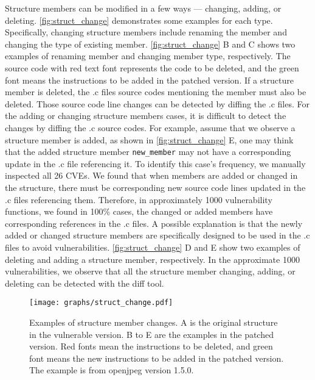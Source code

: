 Structure members can be modified in a few ways --- changing, adding, or deleting. 
\autoref{fig:struct_change} demonstrates some examples for each type.
Specifically, changing structure members include renaming the member and changing the type of existing member. \autoref{fig:struct_change} B and C shows two examples of renaming member and changing member type, respectively.
The source code with red text font represents the code to be deleted, and the green font means the instructions to be added in the patched version. 
If a structure member is deleted, the .c files source codes mentioning the member must also be deleted. 
Those source code line changes can be detected by diffing the .c files. 
For the adding or changing structure members cases, it is difficult to detect the changes by diffing the .c source codes. 
For example, assume that we observe a structure member is added, as shown in \autoref{fig:struct_change} E, one may think that the added structure member \texttt{new\_member} may not have a corresponding update in the .c file referencing it. 
To identify this case's frequency, we manually inspected all 26 CVEs.
We found that when members are added or changed in the structure, there must be corresponding new source code lines updated in the .c files referencing them.
Therefore, in approximately 1000 vulnerability functions, we found in 100\% cases, the changed or added members have corresponding references in the .c files.
A possible explanation is that the newly added or changed structure members are specifically designed to be used in the .c files to avoid vulnerabilities. \autoref{fig:struct_change} D and E show two examples of deleting and adding a structure member, respectively.
In the approximate 1000 vulnerabilities, we observe that all the structure member changing, adding, or deleting can be detected with the diff tool.

\begin{figure}[!h]
\centering
\texttt{[image: graphs/struct\_change.pdf]}
\caption{Examples of structure member changes. A is the original structure in the vulnerable version. B to E are the examples in the patched version. Red fonts mean the instructions to be deleted, and green font means the new instructions to be added in the patched version. The example is from openjpeg version 1.5.0.}
\label{fig:struct_change}
\end{figure}

